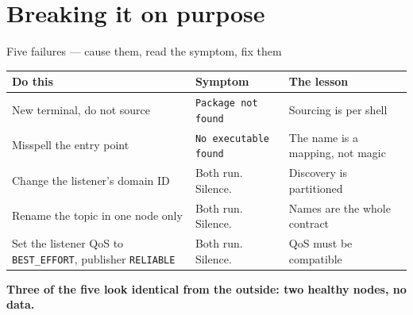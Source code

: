\documentclass[aspectratio=169]{beamer}
\begin{document}
\section{Breaking it on purpose}

\begin{frame}{Five failures --- cause them, read the symptom, fix them}
  \small
  \begin{center}
  \begin{tabular}{@{}p{3.5cm}p{3.6cm}p{3.7cm}@{}}
    \toprule
    \textbf{Do this} & \textbf{Symptom} & \textbf{The lesson} \\
    \midrule
    New terminal, do not source & \texttt{Package not found} & Sourcing is per shell \\[0.3em]
    Misspell the entry point & \texttt{No executable found} & The name is a mapping, not magic \\[0.3em]
    Change the listener's domain ID & Both run. Silence. & Discovery is partitioned \\[0.3em]
    Rename the topic in one node only & Both run. Silence. & Names are the whole contract \\[0.3em]
    Set the listener QoS to \texttt{BEST\_EFFORT}, publisher \texttt{RELIABLE} & Both run. Silence. & QoS must be compatible \\
    \bottomrule
  \end{tabular}
  \end{center}

  \vspace{0.4em}
  \centering\footnotesize
  \textbf{Three of the five look identical from the outside: two healthy nodes, no data.}
\end{frame}
\end{document}
